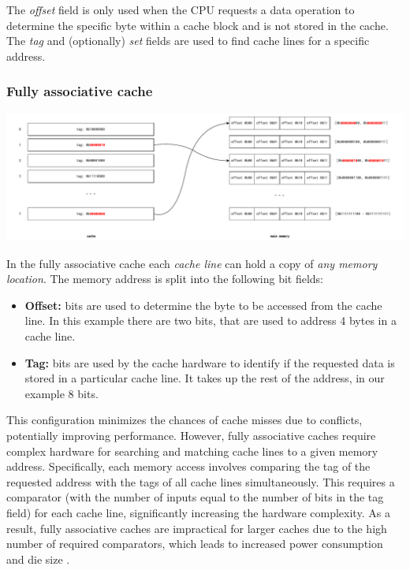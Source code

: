 \noindent The \textit{offset} field is only used when the CPU requests a data operation to determine the specific byte within a cache block and is not stored in the cache. The
\textit{tag} and (optionally) \textit{set} fields are used to find cache lines for a specific address.

\subsubsection{Fully associative cache}
\begin{center}
	\centering
	\includegraphics[width=\textwidth]{figures/02-background/full_ass_mem.pdf}
	\label{fig:full_ass_mem}
\end{center}

\noindent In the fully associative cache each \textit{cache line} can hold a copy of \textit{any memory location}. The memory address is split into the following bit fields:

\begin{itemize}
	\item \textbf{Offset:} bits are used to determine the byte to be accessed from the cache line. In this example there are two bits, that are used to address 4 bytes in a cache line.
	\item \textbf{Tag:} bits are used by the cache hardware to identify if the requested data is stored in a particular cache line. It takes up the rest of the address, in our example 8 bits.
\end{itemize}

\noindent This configuration minimizes the chances of cache misses due to conflicts, potentially improving performance. However, fully associative caches require complex hardware
for searching and matching cache lines to a given memory address. Specifically, each memory access involves comparing the tag of the requested address with the tags of all cache
lines simultaneously. This requires a comparator (with the number of inputs equal to the number of bits in the tag field) for each cache line, significantly increasing the hardware
complexity. As a result, fully associative caches are impractical for larger caches due to the high number of required comparators, which leads to increased power consumption and
die size \cite{whatevery}.

